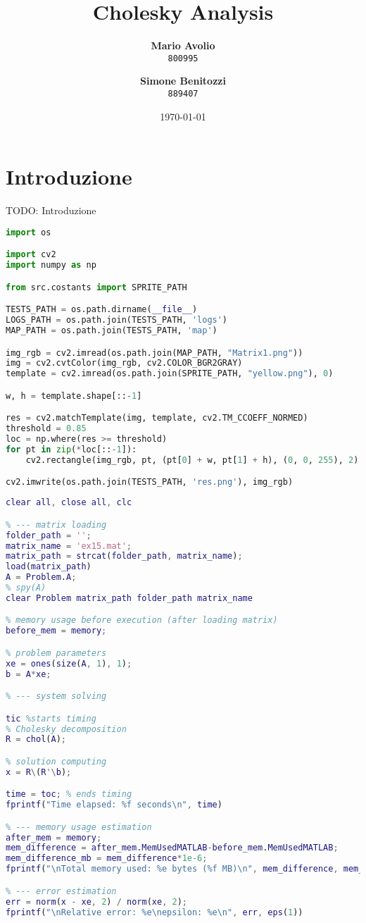 \documentclass[11pt]{article}
\title{Cholesky Analysis}
\author{
  \Large\textbf{Mario Avolio}\\
  \texttt{800995}
  \and
  \Large\textbf{Simone Benitozzi}\\
  \texttt{889407}
}
\date{\today}
\begin{document}
\maketitle

\newpage
\tableofcontents
\thispagestyle{empty}

\newpage
\thispagestyle{empty}


\newpage
\setcounter{page}{1}
\section{Introduzione}
TODO: Introduzione

\begin{lstlisting}[language=Python, caption=Python Code Example]
import os

import cv2
import numpy as np

from src.costants import SPRITE_PATH

TESTS_PATH = os.path.dirname(__file__)
LOGS_PATH = os.path.join(TESTS_PATH, 'logs')
MAP_PATH = os.path.join(TESTS_PATH, 'map')

img_rgb = cv2.imread(os.path.join(MAP_PATH, "Matrix1.png"))
img = cv2.cvtColor(img_rgb, cv2.COLOR_BGR2GRAY)
template = cv2.imread(os.path.join(SPRITE_PATH, "yellow.png"), 0)

w, h = template.shape[::-1]

res = cv2.matchTemplate(img, template, cv2.TM_CCOEFF_NORMED)
threshold = 0.85
loc = np.where(res >= threshold)
for pt in zip(*loc[::-1]):
    cv2.rectangle(img_rgb, pt, (pt[0] + w, pt[1] + h), (0, 0, 255), 2)

cv2.imwrite(os.path.join(TESTS_PATH, 'res.png'), img_rgb)
\end{lstlisting}

\begin{lstlisting}[language=Matlab, caption=Matlab Code Example]
clear all, close all, clc

% --- matrix loading
folder_path = '';
matrix_name = 'ex15.mat';
matrix_path = strcat(folder_path, matrix_name);
load(matrix_path)
A = Problem.A;
% spy(A)
clear Problem matrix_path folder_path matrix_name

% memory usage before execution (after loading matrix)
before_mem = memory;

% problem parameters
xe = ones(size(A, 1), 1);
b = A*xe;

% --- system solving

tic %starts timing
% Cholesky decomposition
R = chol(A);

% solution computing
x = R\(R'\b);

time = toc; % ends timing
fprintf("Time elapsed: %f seconds\n", time)

% --- memory usage estimation
after_mem = memory;
mem_difference = after_mem.MemUsedMATLAB-before_mem.MemUsedMATLAB;
mem_difference_mb = mem_difference*1e-6;
fprintf("\nTotal memory used: %e bytes (%f MB)\n", mem_difference, mem_difference_mb)

% --- error estimation
err = norm(x - xe, 2) / norm(xe, 2);
fprintf("\nRelative error: %e\nepsilon: %e\n", err, eps(1))
\end{lstlisting}
\end{document}
